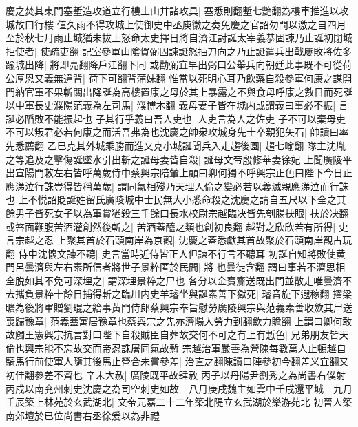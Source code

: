 慶之焚其東門塞塹造攻道立行樓土山并諸攻具|{
	塞悉則翻塹七艷翻為樓車推進以攻城故曰行樓}
值久雨不得攻城上使御史中丞庾徽之奏免慶之官詔勿問以激之自四月至於秋七月雨止城猶未拔上怒命太史擇日將自濟江討誕太宰義恭固諫乃止誕初閉城拒使者|{
	使疏吏翻}
記室參軍山隂賀弼固諫誕怒抽刀向之乃止誕遣兵出戰屢敗將佐多踰城出降|{
	將即亮翻降戶江翻下同}
或勸弼宜早出弼曰公舉兵向朝廷此事既不可從荷公厚恩又義無違背|{
	荷下可翻背蒲妹翻}
惟當以死明心耳乃飲藥自殺參軍何康之謀開門納官軍不果斬關出降誕為高樓置康之母於其上暴露之不與食母呼康之數日而死誕以中軍長史濮陽范義為左司馬|{
	濮博木翻}
義母妻子皆在城内或謂義曰事必不振|{
	言誕必䧟敗不能振起也}
子其行乎義曰吾人吏也|{
	人吏言為人之佐吏}
子不可以棄母吏不可以叛君必若何康之而活吾弗為也沈慶之帥衆攻城身先士卒親犯矢石|{
	帥讀曰率先悉薦翻}
乙巳克其外城乘勝而進又克小城誕聞兵入走趨後園|{
	趨七喻翻}
隊主沈胤之等追及之擊傷誕墜水引出斬之誕母妻皆自殺|{
	誕母文帝殷修華妻徐妃}
上聞廣陵平出宣陽門敇左右皆呼萬歲侍中蔡興宗陪輦上顧曰卿何獨不呼興宗正色曰陛下今日正應涕泣行誅豈得皆稱萬歲|{
	謂同氣相殘乃天理人倫之變必若以義滅親應涕泣而行誅也}
上不悦詔貶誕姓留氏廣陵城中士民無大小悉命殺之沈慶之請自五尺以下全之其餘男子皆死女子以為軍賞猶殺三千餘口長水校尉宗越臨决皆先刳腸抉眼|{
	扶於决翻}
或笞面鞭腹苦酒灌創然後斬之|{
	苦酒蓋醯之類也創初良翻}
越對之欣欣若有所得|{
	史言宗越之忍}
上聚其首於石頭南岸為京觀|{
	沈慶之蓋悉獻其首故聚於石頭南岸觀古玩翻}
侍中沈懷文諫不聽|{
	史言當時近侍皆正人但諫不行言不聽耳}
初誕自知將敗使黄門呂曇濟與左右素所信者將世子景粹匿於民間|{
	將也曇徒含翻}
謂曰事若不濟思相全脱如其不免可深埋之|{
	謂深埋景粹之尸也}
各分以金寶齎送既出門並散走唯曇濟不去攜負景粹十餘日捕得斬之臨川内史羊璿坐與誕素善下獄死|{
	璿音旋下遐稼翻}
擢梁曠為後將軍贈劉琨之給事黄門侍郎蔡興宗奉旨慰勞廣陵興宗與范義素善收歛其尸送喪歸豫章|{
	范義蓋寓居豫章也蔡興宗之先亦濟陽人勞力到翻歛力贍翻}
上謂曰卿何敢故觸王憲興宗抗言對曰陛下自殺賊臣自葬故交何不可之有上有慙色|{
	兄弟朋友皆天倫也興宗能不忘故交而帝忍誅屠同氣故慙}
宗越治軍嚴善為營陳每數萬人止頓越自騎馬行前使軍人隨其後馬止營合未嘗參差|{
	治直之翻陳讀曰陣參初今翻差义宜翻又初佳翻參差不齊也}
辛未大赦|{
	廣陵既平故肆赦}
丙子以丹陽尹劉秀之為尚書右僕射　丙戍以南兖州刺史沈慶之為司空刺史如故　八月庚戌魏主如雲中壬戌還平城　九月壬辰築上林苑於玄武湖北|{
	文帝元嘉二十二年築北隄立玄武湖於樂游苑北}
初晉人築南郊壇於已位尚書右丞徐爰以為非禮

